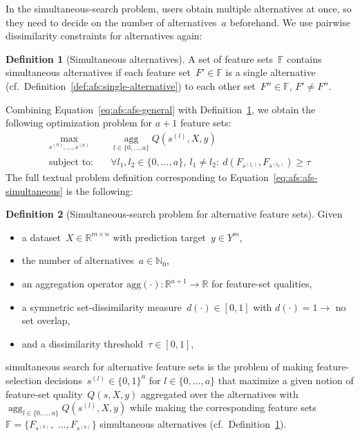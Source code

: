 \documentclass{article}
\theoremstyle{definition}
\newtheorem{definition}{Definition}
\begin{document}
In the simultaneous-search problem, users obtain multiple alternatives at once, so they need to decide on the number of alternatives~$a$ beforehand.
We use pairwise dissimilarity constraints for alternatives again:
%
\begin{definition}[Simultaneous alternatives]
	A set of feature sets~$\mathbb{F}$ contains simultaneous alternatives if each feature set~$F' \in \mathbb{F}$ is a single alternative (cf.~Definition~\ref{def:afs:single-alternative}) to each other set~$F'' \in \mathbb{F}$, $F' \neq F''$.
	\label{def:afs:simultaneous-alternative}
\end{definition}
%
Combining Equation~\ref{eq:afs:afs-general} with Definition~\ref{def:afs:simultaneous-alternative}, we obtain the following optimization problem for $a+1$ feature sets:
%
\begin{equation}
	\begin{aligned}
		\max_{s^{(0)}, \dots, s^{(a)}} &\quad \operatorname*{agg}_{l \in \{0, \dots, a\}} Q(s^{(l)},X,y) \\
		\text{subject to:} &\quad \forall l_1, l_2 \in \{0, \dots, a\},~l_1 \neq l_2:~d(F_{s^{(l_1)}},F_{s^{(l_2)}}) \geq \tau
	\end{aligned}
	\label{eq:afs:afs-simultaneous}
\end{equation}
%
The full textual problem definition corresponding to Equation~\ref{eq:afs:afs-simultaneous} is the following:
%
\begin{definition}[Simultaneous-search problem for alternative feature sets]
	Given
	\begin{itemize}[noitemsep]
		\item a dataset~$X \in \mathbb{R}^{m \times n}$ with prediction target~$y \in Y^m$,
		\item the number of alternatives~$a \in \mathbb{N}_0$,
		\item an aggregation operator $\text{agg}(\cdot): \mathbb{R}^{a+1} \to \mathbb{R}$ for feature-set qualities,
		\item a symmetric set-dissimilarity measure~$d(\cdot) \in [0,1]$ with $d(\cdot) = 1 \rightarrow$ no set overlap,
		\item and a dissimilarity threshold~$\tau \in [0,1]$,
	\end{itemize}
	simultaneous search for alternative feature sets is the problem of making feature-selection decisions~$s^{(l)} \in \{0,1\}^n$ for $l \in \{0, \dots, a\}$ that maximize a given notion of feature-set quality~$Q(s,X,y)$ aggregated over the alternatives with $\operatorname*{agg}_{l \in \{0, \dots, a\}} Q(s^{(l)},X,y)$ while making the corresponding feature sets $\mathbb{F} = \{F_{s^{(0)}},$ $\dots, F_{s^{(a)}}\}$ simultaneous alternatives (cf.~Definition~\ref{def:afs:simultaneous-alternative}).
	\label{def:afs:alternative-feature-selection-simultaneous}
\end{definition}
\end{document}
